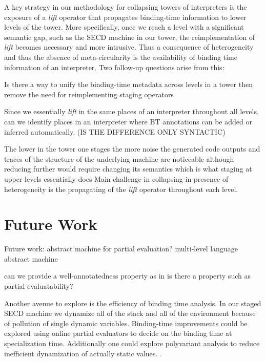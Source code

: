 \documentclass{article}
\theoremstyle{definition}
\begin{document}
A key strategy in our methodology for collapsing towers of interpreters is the exposure of a \textit{lift} operator that propagates binding-time information to lower levels of the tower. More specifically, once we reach a level with a significant semantic gap, such as the SECD machine in our tower, the reimplementation of \textit{lift} becomes necessary and more intrusive. Thus a consequence of heterogeneity and thus the absence of meta-circularity is the availability of binding time information of an interpreter. Two follow-up questions arise from this:
\begin{enumerate*}
	\item Is there a way to unify the binding-time metadata across levels in a tower then remove the need for reimplementing staging operators
	\item Since we essentially \textit{lift} in the same places of an interpreter throughout all levels, can we identify places in an interpreter where BT annotations can be added or inferred automatically. (IS THE DIFFERENCE ONLY SYNTACTIC)
\end{enumerate*}

The lower in the tower one stages the more noise the generated code outputs and traces of the structure of the underlying machine are noticeable although reducing further would require changing its semantics which is what staging at upper levels essentially does
Main challenge in collapsing in presence of heterogeneity is the propagating of the \textit{lift} operator throughout each level.

\section{Future Work}
Future work:
abstract machine for partial evaluation? multi-level language abstract machine

can we provide a well-annotatedness property as in \cite{gomard1991partial}
is there a property such as partial evaluatability?

Another avenue to explore is the efficiency of binding time analysis. In our staged SECD machine we dynamize all of the stack and all of the environment because of pollution of single dynamic variables. Binding-time improvements could be explored using online partial evaluators to decide on the binding time at specialization time. Additionally one could explore polyvariant analysis to reduce inefficient dynamization of actually static values. \cite{danvy1995essence}.
\end{document}
